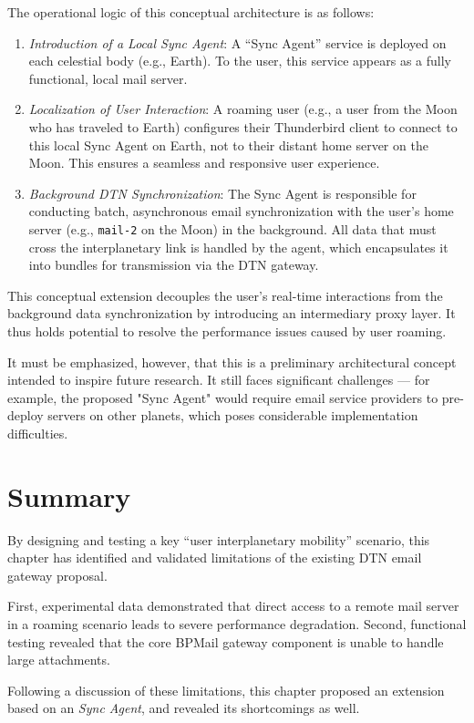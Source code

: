The operational logic of this conceptual architecture is as follows:

\begin{enumerate}
    \item \textit{Introduction of a Local Sync Agent}: A ``Sync Agent'' service is deployed on each celestial body (e.g., Earth). To the user, this service appears as a fully functional, local mail server.
    \item \textit{Localization of User Interaction}: A roaming user (e.g., a user from the Moon who has traveled to Earth) configures their Thunderbird client to connect to this local Sync Agent on Earth, not to their distant home server on the Moon. This ensures a seamless and responsive user experience.
    \item \textit{Background DTN Synchronization}: The Sync Agent is responsible for conducting batch, asynchronous email synchronization with the user's home server (e.g., \texttt{mail-2} on the Moon) in the background. All data that must cross the interplanetary link is handled by the agent, which encapsulates it into bundles for transmission via the DTN gateway.
\end{enumerate}

This conceptual extension decouples the user's real-time interactions from the background data synchronization by introducing an intermediary proxy layer.
It thus holds potential to resolve the performance issues caused by user roaming.

It must be emphasized, however, that this is a preliminary architectural concept intended to inspire future research.  
It still faces significant challenges — for example, the proposed "Sync Agent" would require email service providers to pre-deploy servers on other planets, which poses considerable implementation difficulties.

\section{Summary}

By designing and testing a key ``user interplanetary mobility'' scenario, this chapter has identified and validated limitations of the existing DTN email gateway proposal.  

First, experimental data demonstrated that direct access to a remote mail server in a roaming scenario leads to severe performance degradation.  
Second, functional testing revealed that the core BPMail gateway component is unable to handle large attachments.  

Following a discussion of these limitations, this chapter proposed an extension based on an \textit{Sync Agent}, and revealed its shortcomings as well.
